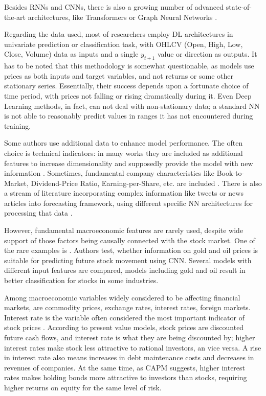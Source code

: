 \documentclass[review, authoryear]{elsarticle}
\begin{document}
Besides RNNs and CNNs, there is also a growing number of advanced state-of-the-art architectures, like Transformers or Graph Neural Networks \citep{matsunaga_exploring_2019, lim_temporal_2021}.

Regarding the data used, most of researchers employ DL architectures in univariate prediction or classification task, with OHLCV (Open, High, Low, Close, Volume) data as inputs and a single $y_{t+1}$ value or direction as outputs.
It has to be noted that this methodology is somewhat questionable, as models use prices as both inputs and target variables, and not returns or some other stationary series. Essentially, their success depends upon a fortunate choice of time period, with prices not falling or rising dramatically during it. Even Deep Learning methods, in fact, can not deal with non-stationary data; a standard NN is not able to reasonably predict values in ranges it has not encountered during training.

Some authors use additional data to enhance model performance.
The often choice is technical indicators: in many works they are included as additional features to increase dimensionality and supposedly provide the model with new information \citep[][and many others]{nelson_stock_2017, singh_stock_2017, zhang_deep_2018, song_study_2019}. Sometimes, fundamental company characteristics like Book-to-Market, Dividend-Price Ratio, Earning-per-Share, etc. are included \citep{feng_deep_2018}.
There is also a stream of literature incorporating complex information like tweets or news articles into forecasting framework, using different specific NN architectures for processing that data \citep{huang_using_2020, kordonis_stock_2016, li_multimodal_2021}.

However, fundamental macroeconomic features are rarely used, despite wide support of those factors being causally connected with the stock market.
One of the rare examples is \cite{chen_constructing_2021}. Authors test, whether information on gold and oil prices is suitable for predicting future stock movement using CNN. Several models with different input features are compared, models including gold and oil result in better classification for stocks in some industries.

Among macroeconomic variables widely considered to be affecting financial markets, are commodity prices, exchange rates, interest rates, foreign markets.
Interest rate is the variable often considered the most important indicator of stock prices \citep{modigliani_inflation_1979}.
According to present value models, stock prices are discounted future cash flows, and interest rate is what they are being discounted by; higher interest rates make stock less attractive to rational investors, an vice versa. A rise in interest rate also means increases in debt maintenance costs and decreases in revenues of companies. At the same time, as CAPM suggests, higher interest rates makes holding bonds more attractive to investors than stocks, requiring higher returns on equity for the same level of risk.
\end{document}
